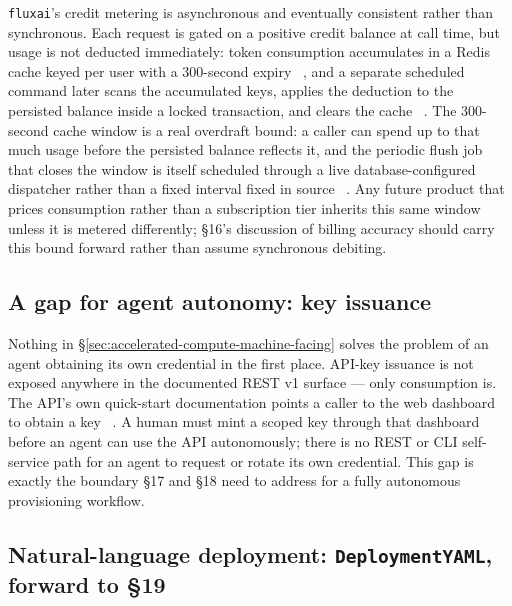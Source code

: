 \texttt{fluxai}'s credit metering is asynchronous and eventually consistent rather than synchronous.
Each request is gated on a positive credit balance at call time, but usage is not deducted
immediately: token consumption accumulates in a Redis cache keyed per user with a 300-second expiry
\shipped\ , and a separate scheduled command later scans the
accumulated keys, applies the deduction to the persisted balance inside a locked transaction, and
clears the cache \shipped\ .
The 300-second cache window is a real overdraft bound: a caller can spend up to that much usage
before the persisted balance reflects it, and the periodic flush job that closes the window is
itself scheduled through a live database-configured dispatcher rather than a fixed interval fixed in
source \shipped\ . Any future product that prices
consumption rather than a subscription tier inherits this same window unless it is metered
differently; \S16's discussion of billing accuracy should carry this bound forward rather than
assume synchronous debiting.

\subsection{A gap for agent autonomy: key issuance}
\label{sec:accelerated-compute-key-issuance}

Nothing in \S\ref{sec:accelerated-compute-machine-facing} solves the problem of an agent obtaining
its own credential in the first place. API-key issuance is not exposed anywhere in the documented
REST v1 surface — only consumption is. The API's own quick-start documentation points a caller to the web
dashboard to obtain a key \shipped\ . A human must
mint a scoped key through that dashboard before an agent can use the \FluxEdge API autonomously; there
is no REST or CLI self-service path for an agent to request or rotate its own credential. This gap
is exactly the boundary \S17 and \S18 need to address for a fully autonomous provisioning workflow.

\subsection{Natural-language deployment: \texttt{DeploymentYAML}, forward to \S19}
\label{sec:accelerated-compute-nl-deploy}

